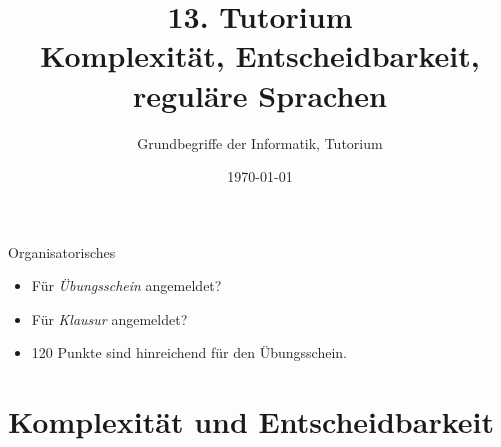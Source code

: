 




\title[Komplexität, Entscheidbarkeit, reguläre Sprachen]{13. Tutorium\\ Komplexität, Entscheidbarkeit, reguläre Sprachen}
\subtitle{Grundbegriffe der Informatik, Tutorium \hashtag \mytutnumber}
\date{\today}


\usetikzlibrary{matrix}
\usetikzlibrary{arrows.meta}
\usetikzlibrary{automata}
\usetikzlibrary{tikzmark}


\titleframe
\begin{frame}{Organisatorisches}
	\begin{itemize}
		\item Für \emph{Übungsschein} angemeldet?
		\item Für \emph{Klausur} angemeldet?
		\item 120 Punkte sind hinreichend für den Übungsschein.
	\end{itemize}
\end{frame}

\roadmap

\section{Komplexität und Entscheidbarkeit}




